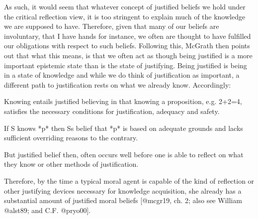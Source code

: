 \documentclass[12pt]{book}
\theoremstyle{definition}
\theoremstyle{remark}
\newcommand{\NormalTok}[1]{#1}
\newenvironment{Shaded}{}{}
\newenvironment{Highlighting}{}{}
\begin{document}
As such, it would seem that whatever concept of justified beliefs we hold under the critical reflection view, it is too stringent to explain much of the knowledge we are supposed to have. Therefore, given that many of our beliefs are involuntary, that I have hands for instance, we often are thought to have fulfilled our obligations with respect to such beliefs. Following this, McGrath then points out that what this means, is that we often act as though being justified is a more important epistemic state than is the state of justifying. Being justified is being in a state of knowledge and while we do think of justification as important, a different path to justification rests on what we already know. Accordingly:

\begin{Shaded}
\begin{Highlighting}[]

\NormalTok{Knowing entails justified believing in that knowing a proposition, e.g. 2+2=4, satisfies the necessary conditions for justification, adequacy and safety.}
\end{Highlighting}
\end{Shaded}

\begin{Shaded}
\begin{Highlighting}[]

\NormalTok{If S knows *p* then S\textquotesingle{}s belief that *p* is based on adequate grounds and lacks sufficient overriding reasons to the contrary.}
\end{Highlighting}
\end{Shaded}

\begin{Shaded}
\begin{Highlighting}[]

\NormalTok{But justified belief then, often occurs well before one is able to reflect on what they know or other methods of justification.}
\end{Highlighting}
\end{Shaded}

\begin{Shaded}
\begin{Highlighting}[]

\NormalTok{Therefore, by the time a typical moral agent is capable of the kind of reflection or other justifying devices necessary for knowledge acquisition, she already has a substantial amount of justified moral beliefs [@mcgr19, ch. 2; also see William @alst89; and C.F. @pryo00].}
\end{Highlighting}
\end{Shaded}
\end{document}
